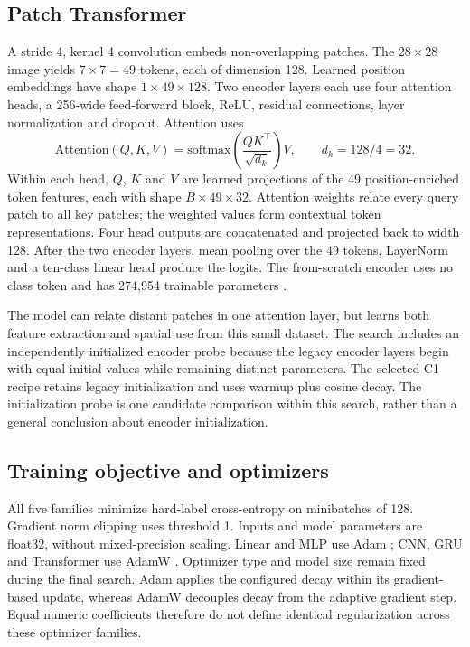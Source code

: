 \subsection{Patch Transformer}
A stride 4, kernel 4 convolution embeds non-overlapping patches. The $28\times28$ image yields $7\times7=49$ tokens, each of dimension 128. Learned position embeddings have shape $1\times49\times128$. Two encoder layers each use four attention heads, a 256-wide feed-forward block, ReLU, residual connections, layer normalization and dropout. Attention uses
\[
\mathrm{Attention}(Q,K,V)=\mathrm{softmax}\left(\frac{QK^\top}{\sqrt{d_k}}\right)V,
\qquad d_k=128/4=32.
\]
Within each head, $Q$, $K$ and $V$ are learned projections of the 49 position-enriched token features, each with shape $B\times49\times32$. Attention weights relate every query patch to all key patches; the weighted values form contextual token representations. Four head outputs are concatenated and projected back to width 128. After the two encoder layers, mean pooling over the 49 tokens, LayerNorm and a ten-class linear head produce the logits. The from-scratch encoder uses no class token and has 274,954 trainable parameters \cite{attention}.

The model can relate distant patches in one attention layer, but learns both feature extraction and spatial use from this small dataset. The search includes an independently initialized encoder probe because the legacy encoder layers begin with equal initial values while remaining distinct parameters. The selected C1 recipe retains legacy initialization and uses warmup plus cosine decay. The initialization probe is one candidate comparison within this search, rather than a general conclusion about encoder initialization.

\subsection{Training objective and optimizers}
All five families minimize hard-label cross-entropy on minibatches of 128. Gradient norm clipping uses threshold 1. Inputs and model parameters are float32, without mixed-precision scaling. Linear and MLP use Adam \cite{adam}; CNN, GRU and Transformer use AdamW \cite{adamw}. Optimizer type and model size remain fixed during the final search. Adam applies the configured decay within its gradient-based update, whereas AdamW decouples decay from the adaptive gradient step. Equal numeric coefficients therefore do not define identical regularization across these optimizer families.


